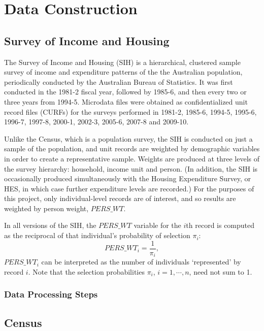 \chapter{Data Construction}


\section{Survey of Income and Housing}

The Survey of Income and Housing (SIH) is a hierarchical, clustered sample survey of income and expenditure patterns of the the Australian population, periodically conducted by the Australian Bureau of Statistics. It was first conducted in the 1981-2 fiscal year, followed by 1985-6, and then every two or three years from 1994-5. Microdata files were obtained as confidentialized unit record files (CURFs) for the surveys performed in 1981-2, 1985-6, 1994-5, 1995-6, 1996-7, 1997-8, 2000-1, 2002-3, 2005-6, 2007-8 and 2009-10.

Unlike the Census, which is a population survey, the SIH is conducted on just a sample of the population, and unit records are weighted by demographic variables in order to create a representative sample. Weights are produced at three levels of the survey hierarchy: household, income unit and person. (In addition, the SIH is occasionally produced simultaneously with the Housing Expenditure Survey, or HES, in which case further expenditure levels are recorded.) For the purposes of this project, only individual-level records are of interest, and so results are weighted by person weight, $PERS\_WT$.

In all versions of the SIH, the $PERS\_WT$ variable for the $i$th record is computed as the reciprocal of that individual's probability of selection $\pi_i$:
$$ PERS\_WT_i = \frac{1}{\pi_i}, $$
$PERS\_WT_i$ can be interpreted as the number of individuals `represented' by record $i$. Note that the selection probabilities $\pi_i$, $i=1,\cdots,n$, need not sum to 1.


\subsection{Data Processing Steps}

\section{Census}




